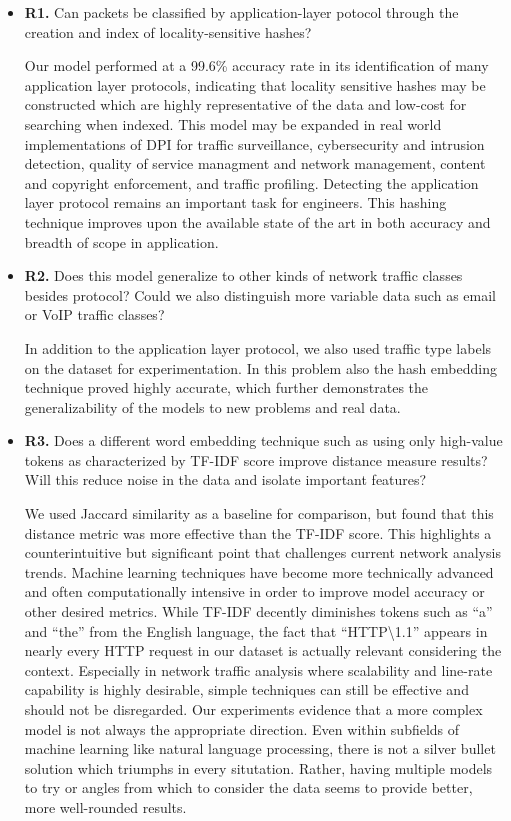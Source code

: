\begin{itemize}
\item\textbf{R1.} Can packets be classified by application-layer potocol through the creation and index of locality-sensitive hashes?

Our model performed at a 99.6\% accuracy rate in its identification of many application layer protocols, indicating that locality sensitive hashes may be constructed which are highly representative of the data and low-cost for searching when indexed. This model may be expanded in real world implementations of DPI for traffic surveillance, cybersecurity and intrusion detection, quality of service managment and network management, content and copyright enforcement, and traffic profiling. Detecting the application layer protocol remains an important task for engineers. This hashing technique improves upon the available state of the art in both accuracy and breadth of scope in application.

\item\textbf{R2.} Does this model generalize to other kinds of network traffic classes besides protocol? Could we also distinguish more variable data such as email or VoIP traffic classes?

In addition to the application layer protocol, we also used traffic type labels on the dataset for experimentation. In this problem also the hash embedding technique proved highly accurate, which further demonstrates the generalizability of the models to new problems and real data.

\item\textbf{R3.} Does a different word embedding technique such as using only high-value tokens as characterized by TF-IDF score improve distance measure results? Will this reduce noise in the data and isolate important features?

We used Jaccard similarity as a baseline for comparison, but found that this distance metric was more effective than the TF-IDF score. This highlights a counterintuitive but significant point that challenges current network analysis trends. Machine learning techniques have become more technically advanced and often computationally intensive in order to improve model accuracy or other desired metrics. While TF-IDF decently diminishes tokens such as ``a'' and ``the'' from the English language, the fact that ``\textsc{HTTP\textbackslash1.1}'' appears in nearly every HTTP request in our dataset is actually relevant considering the context. Especially in network traffic analysis where scalability and line-rate capability is highly desirable, simple techniques can still be effective and should not be disregarded. Our experiments evidence that a more complex model is not always the appropriate direction. Even within subfields of machine learning like natural language processing, there is not a silver bullet solution which triumphs in every situtation. Rather, having multiple models to try or angles from which to consider the data seems to provide better, more well-rounded results.


\end{itemize}
